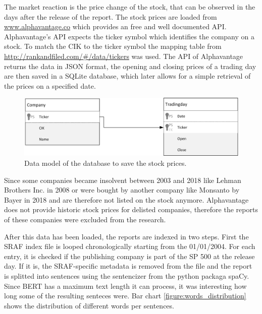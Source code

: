 The market reaction is the price change of the stock, that can be observed in the days after the release of the report.
The stock prices are loaded from \url{www.alphavantage.co} which provides an free and well documented \ac{API}.
Alphavantage's \ac{API} expects the ticker symbol which identifies the company on a stock.
To match the \ac{CIK} to the ticker symbol the mapping table from \url{http://rankandfiled.com/#/data/tickers} was used.
The \ac{API} of Alphavantage returns the data in \ac{JSON} format, the opening and closing prices of a trading day are then saved in a SQLite database, which later allows for a simple retrieval of the prices on a specified date.
\begin{figure}[h]
    \centering
    \includegraphics[width=1\textwidth]{figures/Datenmodell.png}
    \caption{Data model of the database to save the stock prices.}
    \label{figure:data_model}
\end{figure}
Since some companies became insolvent between 2003 and 2018 like Lehman Brothers Inc. in 2008 or were bought by another company like Monsanto by Bayer in 2018 and are therefore not listed on the stock anymore.
Alphavantage does not provide historic stock prices for delisted companies, therefore the reports of these companies were excluded from the research.

After this data has been loaded, the reports are indexed in two steps.
First the \ac{SRAF} index file is looped chronologically starting from the 01/01/2004.
For each entry, it is checked if the publishing company is part of the \ac{SP} 500 at the release day.
If it is, the \ac{SRAF}-specific metadata is removed from the file and the report is splitted into sentences using the sentencizer from the python packaga spaCy.
Since \acs{BERT} has a maximum text length it can process, it was interesting how long some of the resulting senteces were.
Bar chart \ref{figure:words_distribution} shows the distribution of different words per sentences.

